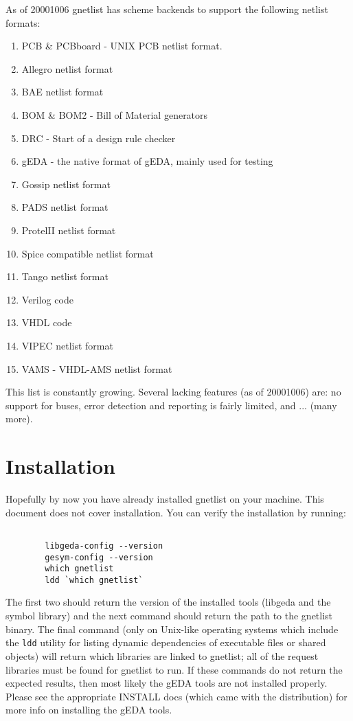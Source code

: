 \documentclass{article}
\begin{document}
As of 20001006 gnetlist has scheme backends to support the following
netlist formats:
\begin{enumerate}
\item PCB \& PCBboard - UNIX PCB netlist format.  
\item Allegro netlist format 
\item BAE netlist format 
\item BOM \& BOM2 - Bill of Material generators 
\item DRC - Start of a design rule checker 
\item gEDA - the native format of gEDA, mainly used for testing 
\item Gossip netlist format 
\item PADS netlist format 
\item ProtelII netlist format
\item Spice compatible netlist format 
\item Tango netlist format 
\item Verilog code 
\item VHDL code 
\item VIPEC netlist format 
\item VAMS - VHDL-AMS netlist format
\end{enumerate}

This list is constantly growing.  Several lacking features (as of
20001006) are: no support for buses, error detection and reporting is
fairly limited, and ... (many more).



\section{Installation}
Hopefully by now you have already installed gnetlist on your machine.
This document does not cover installation.  You can verify the
installation by running:
\begin{verbatim}

        libgeda-config --version 
        gesym-config --version 
        which gnetlist
        ldd `which gnetlist`

\end{verbatim}
The first two should return the version of the installed tools
(libgeda and the symbol library) and the next command should return
the path to the gnetlist binary.  The final command (only on Unix-like
operating systems which include the {\tt ldd} utility for listing
dynamic dependencies of executable files or shared objects)
will return which libraries are linked to gnetlist; all of
the request libraries must be found for gnetlist to run.  If these
commands do not return the expected results, then most likely the gEDA
tools are not installed properly.  Please see the appropriate INSTALL
docs (which came with the distribution) for more info on installing
the gEDA tools.
\end{document}
